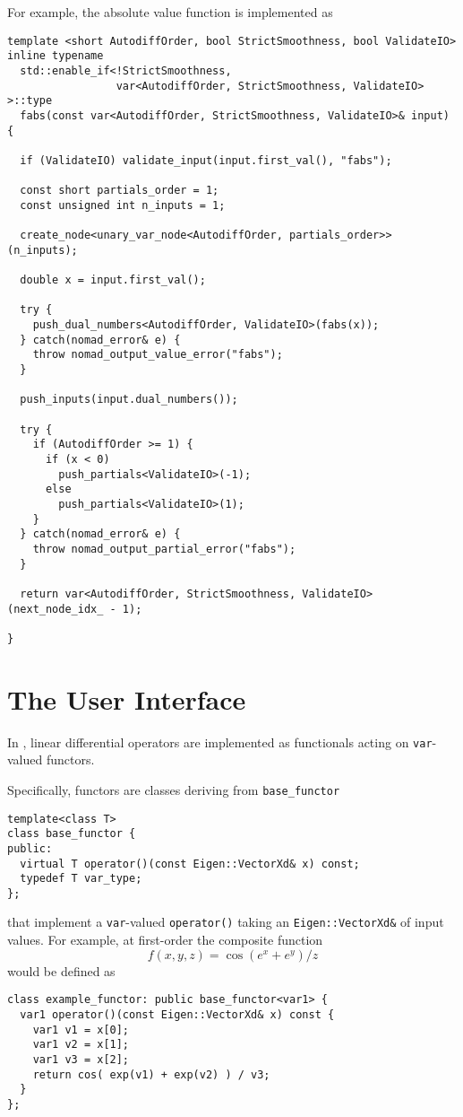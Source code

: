 For example, the absolute value function is implemented as
%
\begin{verbatim}
template <short AutodiffOrder, bool StrictSmoothness, bool ValidateIO>
inline typename 
  std::enable_if<!StrictSmoothness, 
                 var<AutodiffOrder, StrictSmoothness, ValidateIO> >::type
  fabs(const var<AutodiffOrder, StrictSmoothness, ValidateIO>& input) {
    
  if (ValidateIO) validate_input(input.first_val(), "fabs");
      
  const short partials_order = 1;
  const unsigned int n_inputs = 1;
    
  create_node<unary_var_node<AutodiffOrder, partials_order>>(n_inputs);

  double x = input.first_val();
    
  try {
    push_dual_numbers<AutodiffOrder, ValidateIO>(fabs(x));
  } catch(nomad_error& e) {
    throw nomad_output_value_error("fabs");
  }
      
  push_inputs(input.dual_numbers());
    
  try {
    if (AutodiffOrder >= 1) {
      if (x < 0)
        push_partials<ValidateIO>(-1);
      else
        push_partials<ValidateIO>(1);
    }
  } catch(nomad_error& e) {
    throw nomad_output_partial_error("fabs");
  }

  return var<AutodiffOrder, StrictSmoothness, ValidateIO>(next_node_idx_ - 1);
    
}
\end{verbatim}

\section{The \nomad User Interface}
\label{sec:user_interface}

In \nomad, linear differential operators are implemented as functionals acting
on \verb|var|-valued functors.

Specifically, functors are classes deriving from \verb|base_functor|
%
\begin{verbatim}
template<class T>
class base_functor {
public:
  virtual T operator()(const Eigen::VectorXd& x) const;
  typedef T var_type;
};
\end{verbatim}
%
that implement a \verb|var|-valued \verb|operator()| taking an
\verb|Eigen::VectorXd&| of input values.  For example, at
first-order the composite function
%
\begin{equation*}
f \! \left( x, y, z \right) = \cos \! \left( e^{x} + e^{y} \right) / z
\end{equation*}
%
would be defined as
%
\begin{verbatim}
class example_functor: public base_functor<var1> {
  var1 operator()(const Eigen::VectorXd& x) const {
    var1 v1 = x[0];
    var1 v2 = x[1];
    var1 v3 = x[2];
    return cos( exp(v1) + exp(v2) ) / v3;  
  }
};
\end{verbatim}

